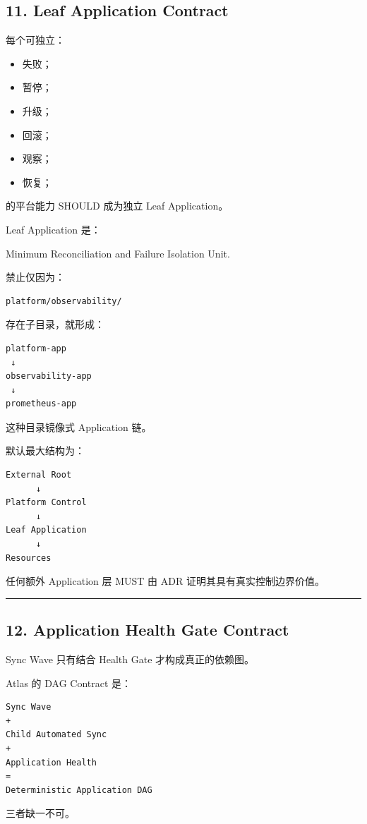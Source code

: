 \documentclass[11pt,a4paper]{article}
\begin{document}
\subsection{11. Leaf Application Contract}
每个可独立：

\begin{itemize}
  \item 失败；
  \item 暂停；
  \item 升级；
  \item 回滚；
  \item 观察；
  \item 恢复；
\end{itemize}
的平台能力 SHOULD 成为独立 Leaf Application。

Leaf Application 是：

\begin{gfmBlockquote}
Minimum Reconciliation and Failure Isolation Unit.
\end{gfmBlockquote}
禁止仅因为：

\begin{lstlisting}[language=text]
platform/observability/
\end{lstlisting}
存在子目录，就形成：

\begin{lstlisting}[language=text]
platform-app
 ↓
observability-app
 ↓
prometheus-app
\end{lstlisting}
这种目录镜像式 Application 链。

默认最大结构为：

\begin{lstlisting}[language=text]
External Root
      ↓
Platform Control
      ↓
Leaf Application
      ↓
Resources
\end{lstlisting}
任何额外 Application 层 MUST 由 ADR 证明其具有真实控制边界价值。

\vspace{0.5em}\hrule\vspace{0.5em}
\subsection{12. Application Health Gate Contract}
Sync Wave 只有结合 Health Gate 才构成真正的依赖图。

Atlas 的 DAG Contract 是：

\begin{lstlisting}[language=text]
Sync Wave
+
Child Automated Sync
+
Application Health
=
Deterministic Application DAG
\end{lstlisting}
三者缺一不可。
\end{document}
